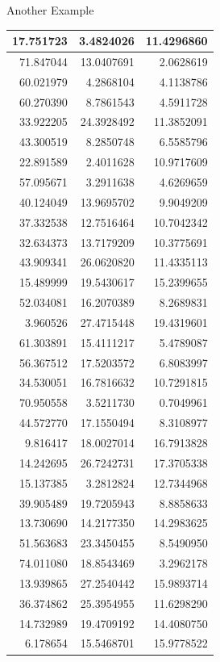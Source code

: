 \documentclass[
  ignorenonframetext,
]{beamer}
\begin{document}
\begin{frame}{Another Example}
\begin{table}
\begin{tabular}[t]{r|r|r}
\hline
17.751723 & 3.4824026 & 11.4296860\\
\hline
71.847044 & 13.0407691 & 2.0628619\\
\hline
60.021979 & 4.2868104 & 4.1138786\\
\hline
60.270390 & 8.7861543 & 4.5911728\\
\hline
33.922205 & 24.3928492 & 11.3852091\\
\hline
43.300519 & 8.2850748 & 6.5585796\\
\hline
22.891589 & 2.4011628 & 10.9717609\\
\hline
57.095671 & 3.2911638 & 4.6269659\\
\hline
40.124049 & 13.9695702 & 9.9049209\\
\hline
37.332538 & 12.7516464 & 10.7042342\\
\hline
32.634373 & 13.7179209 & 10.3775691\\
\hline
43.909341 & 26.0620820 & 11.4335113\\
\hline
15.489999 & 19.5430617 & 15.2399655\\
\hline
52.034081 & 16.2070389 & 8.2689831\\
\hline
3.960526 & 27.4715448 & 19.4319601\\
\hline
61.303891 & 15.4111217 & 5.4789087\\
\hline
56.367512 & 17.5203572 & 6.8083997\\
\hline
34.530051 & 16.7816632 & 10.7291815\\
\hline
70.950558 & 3.5211730 & 0.7049961\\
\hline
44.572770 & 17.1550494 & 8.3108977\\
\hline
9.816417 & 18.0027014 & 16.7913828\\
\hline
14.242695 & 26.7242731 & 17.3705338\\
\hline
15.137385 & 3.2812824 & 12.7344968\\
\hline
39.905489 & 19.7205943 & 8.8858633\\
\hline
13.730690 & 14.2177350 & 14.2983625\\
\hline
51.563683 & 23.3450455 & 8.5490950\\
\hline
74.011080 & 18.8543469 & 3.2962178\\
\hline
13.939865 & 27.2540442 & 15.9893714\\
\hline
36.374862 & 25.3954955 & 11.6298290\\
\hline
14.732989 & 19.4709192 & 14.4080750\\
\hline
6.178654 & 15.5468701 & 15.9778522\\

\end{tabular}
\end{table}
\end{frame}
\end{document}
